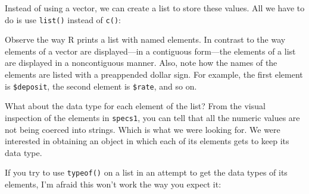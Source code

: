 \documentclass[
]{book}
\newenvironment{Shaded}{\begin{snugshade}}{\end{snugshade}}
\newcommand{\CommentTok}[1]{\textcolor[rgb]{0.56,0.35,0.01}{\textit{#1}}}
\newcommand{\DecValTok}[1]{\textcolor[rgb]{0.00,0.00,0.81}{#1}}
\newcommand{\ErrorTok}[1]{\textcolor[rgb]{0.64,0.00,0.00}{\textbf{#1}}}
\newcommand{\FloatTok}[1]{\textcolor[rgb]{0.00,0.00,0.81}{#1}}
\newcommand{\FunctionTok}[1]{\textcolor[rgb]{0.00,0.00,0.00}{#1}}
\newcommand{\NormalTok}[1]{#1}
\newcommand{\OtherTok}[1]{\textcolor[rgb]{0.56,0.35,0.01}{#1}}
\newcommand{\SpecialCharTok}[1]{\textcolor[rgb]{0.00,0.00,0.00}{#1}}
\newcommand{\StringTok}[1]{\textcolor[rgb]{0.31,0.60,0.02}{#1}}
\begin{document}
Instead of using a vector, we can create a list to store these values. All we
have to do is use \texttt{list()} instead of \texttt{c()}:

\begin{Shaded}
\end{Shaded}

Observe the way R prints a list with named elements. In contrast to the way
elements of a vector are displayed---in a contiguous form---the elements of a
list are displayed in a noncontiguous manner. Also, note how the names of the
elements are listed with a preappended dollar sign. For example, the first
element is \texttt{\$deposit}, the second element is \texttt{\$rate}, and so on.

What about the data type for each element of the list? From the visual inspection
of the elements in \texttt{specs1}, you can tell that all the numeric values are not
being coerced into strings. Which is what we were looking for. We were interested
in obtaining an object in which each of its elements gets to keep its data type.

If you try to use \texttt{typeof()} on a list in an attempt to get the data types of
its elements, I'm afraid this won't work the way you expect it:
\end{document}
